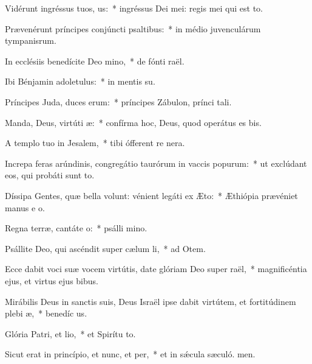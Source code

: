 \item Vidérunt ingréssus tuos, us:~* ingréssus Dei mei: regis mei qui est  to.
\item Prævenérunt príncipes conjúncti psaltibus:~* in médio juvenculárum tympanisrum.
\item In ecclésiis benedícite Deo mino,~* de fónti raël.
\item Ibi Bénjamin adoletulus:~* in mentis su.
\item Príncipes Juda, duces erum:~* príncipes Zábulon, prínci tali.
\item Manda, Deus, virtúti æ:~* confírma hoc, Deus, quod operátus es  bis.
\item A templo tuo in Jesalem,~* tibi ófferent re nera.
\item Increpa feras arúndinis, congregátio taurórum in vaccis popurum:~* ut exclúdant eos, qui probáti sunt to.
\item Díssipa Gentes, quæ bella volunt: vénient legáti ex Æto:~* Æthiópia prævéniet manus e o.
\item Regna terræ, cantáte o:~* psálli mino.
\item Psállite Deo, qui ascéndit super cælum li,~* ad Otem.
\item Ecce dabit voci suæ vocem virtútis, date glóriam Deo super raël,~* magnificéntia ejus, et virtus ejus  bibus.
\item Mirábilis Deus in sanctis suis, Deus Israël ipse dabit virtútem, et fortitúdinem plebi æ,~* benedíc us.
\item Glória Patri, et lio,~* et Spirítu to.
\item Sicut erat in princípio, et nunc, et per,~* et in sǽcula sæculó. men.
